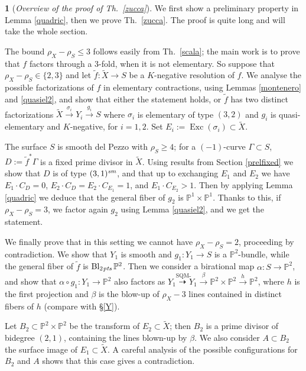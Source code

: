 \documentclass[a4paper,12pt]{amsart}
\theoremstyle{definition}
\newtheorem{prg}[thm]{}
\numberwithin{figure}{section}
\numberwithin{table}{section}
\newcommand{\w}{\widetilde}
\newcommand{\pr}{\mathbb{P}}
\newcommand{\Exc}{\operatorname{Exc}}
\newcommand{\Bl}{\operatorname{Bl}}
\newcommand{\sm}{\text{\it sm}}
\newcommand{\pts}{\text{\it pts}}
\begin{document}
\begin{prg}[\em Overview of the proof of Th.~\ref{zucca}]\label{overviewzucca}
We first show a preliminary property in Lemma \ref{quadric}, then we prove
Th.~\ref{zucca}.
The proof is quite long and will take the whole section.

The bound $\rho_X-\rho_S\leq 3$ follows easily from Th.~\ref{scala}; the main work is to prove that $f$ factors through a $3$-fold, when it is not elementary. So suppose that $\rho_X-\rho_S\in\{2,3\}$ and let $\tilde{f}\colon \w{X}\to S$ be a $K$-negative resolution of $f$. We analyse the possible factorizations of $f$ in elementary contractions, using Lemmas \ref{montenero} and \ref{quasiel2}, and show that either the statement holds, or $\tilde{f}$ has two distinct factorizations $\w{X}\stackrel{\sigma_i}{\to}Y_i\stackrel{g_i}{\to} S$ where $\sigma_i$ is elementary of type $(3,2)$ and $g_i$ is quasi-elementary and $K$-negative, for $i=1,2$. Set $E_i:=\Exc(\sigma_i)\subset\w{X}$.

The surface $S$ is smooth del Pezzo with $\rho_S\geq 4$; for a $(-1)$-curve $\Gamma\subset S$,  $D:=\tilde{f}^*\Gamma$ is a fixed prime divisor in $\w{X}$. Using results from Section \ref{prelfixed} we show that $D$ is of type $(3,1)^{\sm}$, and that up to exchanging $E_1$ and $E_2$ we have $E_1\cdot C_D=0$, $E_2\cdot C_D=E_2\cdot C_{E_1}=1$, and $E_1\cdot C_{E_2}>1$. Then by applying Lemma \ref{quadric} we deduce that the general fiber of $g_2$ is $\pr^1\times\pr^1$.
Thanks to  this, if $\rho_X-\rho_S=3$, we factor again $g_2$ using Lemma \ref{quasiel2}, and we get the statement. 

We finally prove that in this setting we cannot have $\rho_X-\rho_S=2$,
proceeding by contradiction. We show that $Y_1$ is smooth and $g_1\colon Y_1\to S$ is a $\pr^2$-bundle, while
the general fiber of $\tilde{f}$ is $\Bl_{2\mskip1mu\pts}\pr^2$.
Then we consider a birational map $\alpha\colon S\to\pr^2$, and show that  $\alpha\circ g_1\colon Y_1\to \pr^2$ also factors as $Y_1\stackrel{\text{SQM}}{\dasharrow} \w{Y}_1 \stackrel{\beta}{\to} \pr^2\times\pr^2
\stackrel{h}{\to}\pr^2$, where $h$ is the first projection and $\beta$ is the blow-up of $\rho_X-3$ lines contained in distinct fibers of $h$ (compare with \S\ref{Y}).

Let  $B_2\subset \pr^2\times\pr^2$ be the transform of $E_2\subset\w{X}$; then $B_2$ is a prime divisor of bidegree $(2,1)$, containing the lines blown-up by $\beta$. We also consider $A\subset B_2$ the surface  image of $E_1\subset\w{X}$.
A careful analysis of the possible configurations for $B_2$ and $A$ shows that this case gives a contradiction.
\end{prg}
\end{document}
